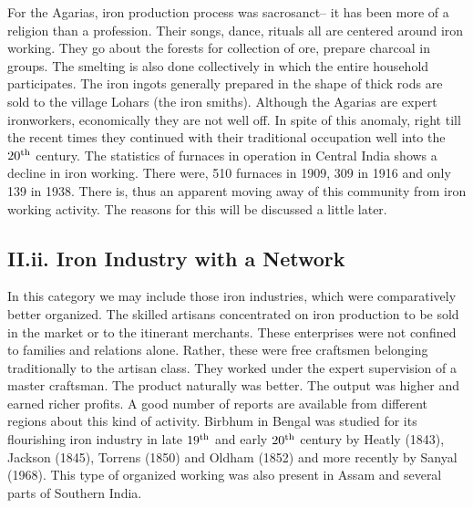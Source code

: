 For the Agarias, iron production process was sacrosanct– it has been more of a religion than a profession. Their songs, dance, rituals all are centered around iron working.  They go about the forests for collection of ore, prepare charcoal in groups.  The smelting is also done collectively in which the entire household participates.  The iron ingots generally prepared in the shape of thick rods are sold to the village Lohars (the iron smiths). Although the Agarias are expert ironworkers, economically they are not well off.  In spite of this anomaly, right till the recent times they continued with their traditional occupation well into the $20^{\rm th}$ century. The statistics of furnaces in operation in Central India shows a decline in iron working. There were, 510 furnaces in 1909, 309 in 1916 and only 139 in 1938.  There is, thus an apparent moving away of this community from iron working activity. The reasons for this will be discussed a little later. 


\vspace{-.3cm}

\subsection*{II.ii.   Iron Industry with a Network}\label{subsection-2}

\vspace{-.2cm}

In this category we may include those iron industries, which were comparatively better organized.  The skilled artisans concentrated on iron production to be sold in the market or to the itinerant merchants.  These enterprises were not confined to families and relations alone.  Rather, these were free craftsmen belonging traditionally to the artisan class.  They worked under the expert supervision of a master craftsman.  The product naturally was better. The output was higher and earned richer profits.  A good number of reports are available from different regions about this kind of activity. Birbhum in Bengal was studied for its flourishing iron industry in late $19^{\rm th}$ and early $20^{\rm th}$ century by Heatly (1843), Jackson (1845), Torrens (1850) and Oldham (1852) and more recently by Sanyal (1968). This type of organized working was also present in Assam and several parts of Southern India.

